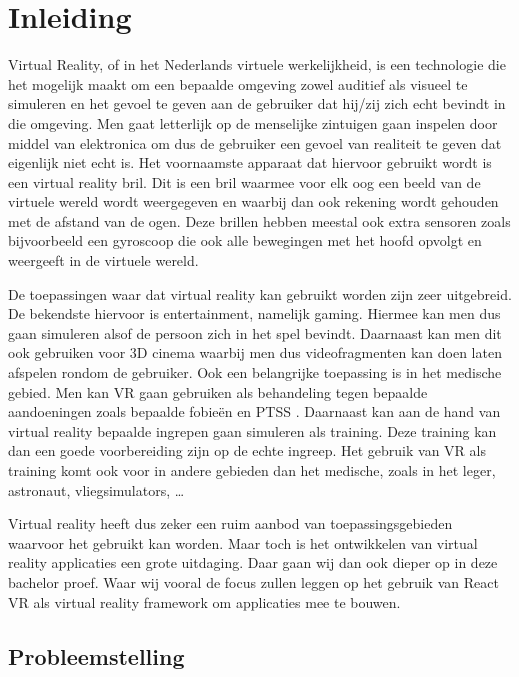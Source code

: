 
\chapter{Inleiding}
\label{ch:inleiding}
Virtual Reality, of in het Nederlands virtuele werkelijkheid, is een technologie die het mogelijk maakt om een bepaalde omgeving zowel auditief als visueel te simuleren en het gevoel te geven aan de gebruiker dat hij/zij zich echt bevindt in die omgeving. Men gaat letterlijk op de menselijke zintuigen gaan inspelen door middel van elektronica om dus de gebruiker een gevoel van realiteit te geven dat eigenlijk niet echt is. Het voornaamste apparaat dat hiervoor gebruikt wordt is een virtual reality bril. Dit is een bril waarmee voor elk oog een beeld van de virtuele wereld wordt weergegeven en waarbij dan ook rekening wordt gehouden met de afstand van de ogen. Deze brillen hebben meestal ook extra sensoren zoals bijvoorbeeld een gyroscoop die ook alle bewegingen met het hoofd opvolgt en weergeeft in de virtuele wereld.

De toepassingen waar dat virtual reality kan gebruikt worden zijn zeer uitgebreid. De bekendste hiervoor is entertainment, namelijk gaming. Hiermee kan men dus gaan simuleren alsof de persoon zich in het spel bevindt. Daarnaast kan men dit ook gebruiken voor 3D cinema waarbij men dus videofragmenten kan doen laten afspelen rondom de gebruiker. Ook een belangrijke toepassing is in het medische gebied. Men kan VR gaan gebruiken als behandeling tegen bepaalde aandoeningen zoals bepaalde fobieën en PTSS \autocite{WikipediaVR2018}. Daarnaast kan aan de hand van virtual reality bepaalde ingrepen gaan simuleren als training. Deze training kan dan een goede voorbereiding zijn op de echte ingreep. Het gebruik van VR als training komt ook voor in andere gebieden dan het medische, zoals in het leger, astronaut, vliegsimulators, …

Virtual reality heeft dus zeker een ruim aanbod van toepassingsgebieden waarvoor het gebruikt kan worden. Maar toch is het ontwikkelen van virtual reality applicaties een grote uitdaging. Daar gaan wij dan ook dieper op in deze bachelor proef. Waar wij vooral de focus zullen leggen op het gebruik van React VR als virtual reality framework om applicaties mee te bouwen.

\section{Probleemstelling}
\label{sec:probleemstelling}

